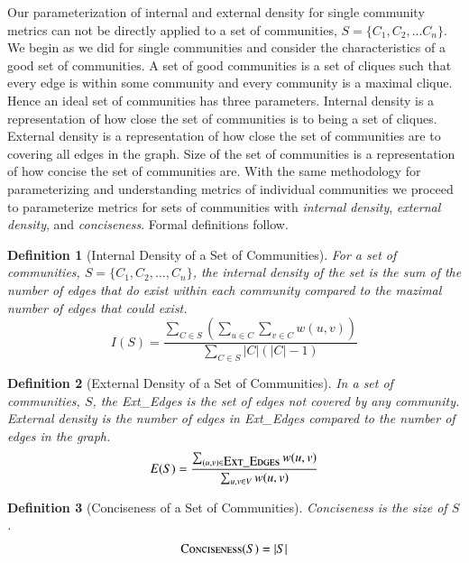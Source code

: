 \documentclass[phd,tocprelim]{cornell}
\newtheorem{definition}{Definition}
\begin{document}
Our parameterization of internal and external density for single community metrics can not be directly applied to a set of communities, $S = \{C_1,C_2,...C_n\}$. We begin as we did for single communities and consider the characteristics of a good set of communities.  A set of good communities is a set of cliques such that every edge is within some community and every community is a maximal clique. Hence an ideal set of communities has three parameters. Internal density is a representation of how close the set of communities is to being a set of cliques. External density is a representation of how close the set of communities are to covering all edges in the graph. Size of the set of communities is a representation of how concise the set of communities are. With the same methodology for parameterizing and understanding metrics of individual communities we proceed to parameterize metrics for sets of communities with {\it internal density}, {\it external density}, and {\it conciseness}.  Formal definitions follow.

\begin{definition}[Internal Density of a Set of Communities] For a set of communities, $S = \{C_1, C_2, \dots, C_n\}$, the internal density of the set is the sum of the number of edges that do exist within each community compared to the mazimal number of edges that could exist.
\begin{equation}
I(S) = \frac{\sum_{C \in S} \left( \sum_{u \in C} \sum_{v \in C} w(u,v)\right)}{\sum_{C \in S}|C|(|C| - 1)}
\end{equation}
\label{def_int_set}
\end{definition}

\begin{definition}[External Density of a Set of Communities] In a set of communities, $S$, the {\sc Ext\_Edges} is the set of edges not covered by any community.  External density is the number of edges in {\sc Ext\_Edges} compared to the number of edges in the graph.
\begin{equation}
E(S) = \frac{\sum_{(u, v) \in \mbox{\sc Ext\_Edges}} w(u,v)} {\sum_{u,v \in V}w(u,v)}
\end{equation}
\label{def_ext_set}
\end{definition}

\begin{definition}[Conciseness of a Set of Communities]  Conciseness is the size of $S$.
\begin{equation}
\mbox{\sc Conciseness}(S) = |S|
\end{equation}
\label{def_conciseness}
\end{definition}
\end{document}

